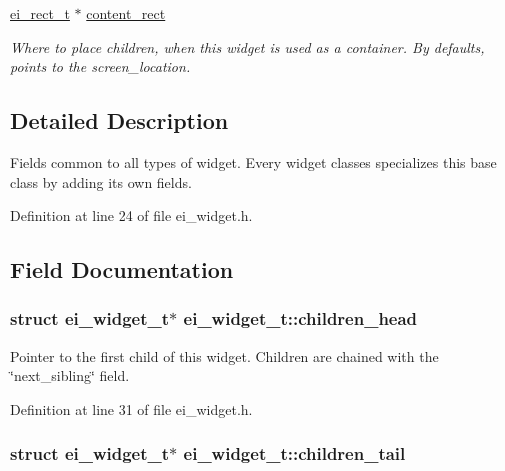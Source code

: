 \begin{DoxyCompactItemize}
\hyperlink{structei__rect__t}{ei\+\_\+rect\+\_\+t} $\ast$ \hyperlink{structei__widget__t_a75c29d388a5f5b32cdd8a9c855bc2a75}{content\+\_\+rect}
\begin{DoxyCompactList}\small\item\em Where to place children, when this widget is used as a container. By defaults, points to the screen\+\_\+location. \end{DoxyCompactList}\end{DoxyCompactItemize}


\subsection{Detailed Description}
Fields common to all types of widget. Every widget classes specializes this base class by adding its own fields. 

Definition at line 24 of file ei\+\_\+widget.\+h.



\subsection{Field Documentation}
\hypertarget{structei__widget__t_a190316f0ec41d2d98b919414c860f828}{
\subsubsection[{children\+\_\+head}]{\setlength{\rightskip}{0pt plus 5cm}struct {\bf ei\+\_\+widget\+\_\+t}$\ast$ ei\+\_\+widget\+\_\+t\+::children\+\_\+head}}\label{structei__widget__t_a190316f0ec41d2d98b919414c860f828}


Pointer to the first child of this widget. Children are chained with the \char`\"{}next\+\_\+sibling\char`\"{} field. 



Definition at line 31 of file ei\+\_\+widget.\+h.

\hypertarget{structei__widget__t_aece2f3059f252538ae787857e7eea2a2}{
\subsubsection[{children\+\_\+tail}]{\setlength{\rightskip}{0pt plus 5cm}struct {\bf ei\+\_\+widget\+\_\+t}$\ast$ ei\+\_\+widget\+\_\+t\+::children\+\_\+tail}}\label{structei__widget__t_aece2f3059f252538ae787857e7eea2a2}


